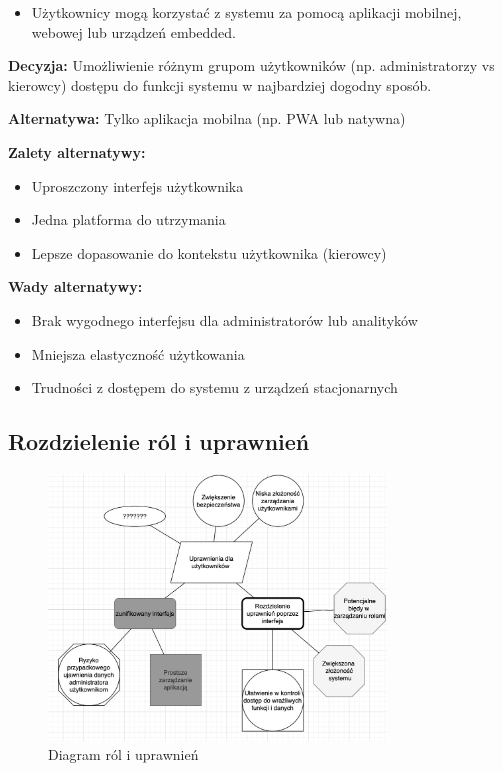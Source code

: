 \documentclass[12pt]{article}
\begin{document}
\begin{itemize}
\item Użytkownicy mogą korzystać z systemu za pomocą aplikacji mobilnej, webowej lub urządzeń embedded.
\end{itemize}

\textbf{Decyzja:} Umożliwienie różnym grupom użytkowników (np. administratorzy vs kierowcy) dostępu do funkcji systemu w najbardziej dogodny sposób.

\textbf{Alternatywa:} Tylko aplikacja mobilna (np. PWA lub natywna)

\textbf{Zalety alternatywy:}
\begin{itemize}
\item Uproszczony interfejs użytkownika
\item Jedna platforma do utrzymania
\item Lepsze dopasowanie do kontekstu użytkownika (kierowcy)
\end{itemize}

\textbf{Wady alternatywy:}
\begin{itemize}
\item Brak wygodnego interfejsu dla administratorów lub analityków
\item Mniejsza elastyczność użytkowania
\item Trudności z dostępem do systemu z urządzeń stacjonarnych
\end{itemize}

\subsection{Rozdzielenie ról i uprawnień}
\begin{figure}[H]
\centering
\includegraphics[width=0.8\textwidth]{uprawnienia_dla_uzytkownikow.png}
\caption{Diagram ról i uprawnień}
\label{fig:roles}
\end{figure}
\end{document}
